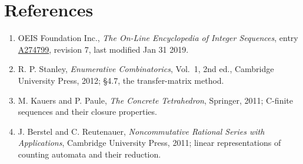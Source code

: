 \documentclass[11pt]{article}
\theoremstyle{definition}
\begin{document}
\section{References}

\begin{enumerate}

\item OEIS Foundation Inc., \emph{The On-Line Encyclopedia of Integer Sequences}, entry \href{https://oeis.org/A274799}{A274799}, revision 7, last modified Jan 31 2019.

\item R. P. Stanley, \emph{Enumerative Combinatorics}, Vol.~1, 2nd ed., Cambridge University Press, 2012; \S4.7, the transfer-matrix method.

\item M. Kauers and P. Paule, \emph{The Concrete Tetrahedron}, Springer, 2011; C-finite sequences and their closure properties.

\item J. Berstel and C. Reutenauer, \emph{Noncommutative Rational Series with Applications}, Cambridge University Press, 2011; linear representations of counting automata and their reduction.

\end{enumerate}
\end{document}
